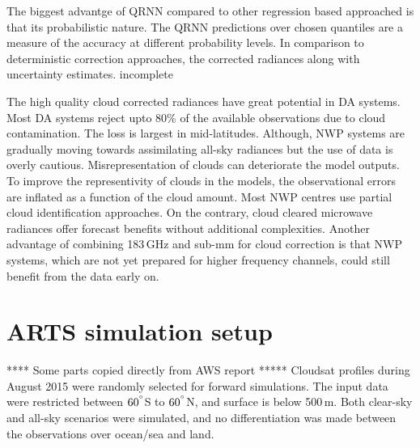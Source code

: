 \documentclass[amt, manuscript]{copernicus}
\newcommand{\todo}[1]{{\color{red} #1}}
\begin{document}
The biggest advantge of QRNN compared to other regression based approached is that its probabilistic nature. The QRNN predictions over chosen quantiles are a measure of the accuracy at different probability levels. In comparison to deterministic correction approaches, the corrected radiances along with uncertainty estimates. \todo{incomplete}  


The high quality cloud corrected radiances have great potential in DA systems. Most DA systems reject upto 80\% of the available observations due to cloud contamination. The loss is largest in mid-latitudes. Although, NWP systems are gradually moving towards assimilating all-sky radiances but the use of data is overly cautious. Misrepresentation of clouds can deteriorate the model outputs. To improve the representivity of clouds in the models, the observational errors are inflated as a function of the cloud amount. Most NWP centres use partial cloud identification approaches. On the contrary, cloud cleared microwave radiances offer forecast benefits without additional complexities. Another advantage of combining 183\,GHz and sub-mm for cloud correction is that NWP systems, which are not yet prepared for higher frequency channels, could still benefit from the data early on. 













\appendix
\section{ARTS simulation setup}    %
\label{appendix:ARTS_setup}
%
**** Some parts copied directly from AWS report *****
Cloudsat profiles during August 2015 were randomly selected for forward simulations. The input data were restricted between $60^{^{\circ}}$S to $60^{^{\circ}}$N, and surface is below 500\,m. Both clear-sky and all-sky scenarios were simulated, and no differentiation was made between the observations over ocean/sea and land. 
\end{document}
